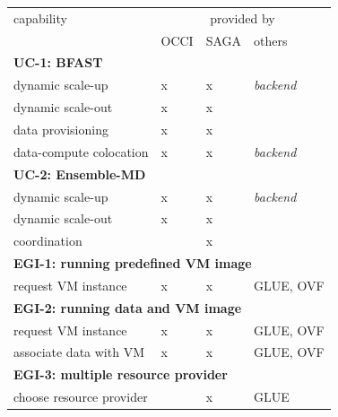 \documentclass[10pt,conference,final,letterpaper,twoside,twocolumn,]{IEEEtran}
\newcommand{\I}[1]{\textit{#1}}
\newcommand{\B}[1]{\textbf{#1}}
\begin{document}
 \begin{table}[thb]
  \centering
  \footnotesize
  \begin{tabular}{|p{37mm}|p{10mm}|p{10mm}|p{15mm}|}
   \hline
   capability                      & \multicolumn{3}{|c|}{provided by}\\
                                   & OCCI                  & SAGA                  & others     \\\hline
   \multicolumn{4}{|l|}{\B{UC-1: BFAST}}                                                        \\
   dynamic scale-up                & x                     & x                     & \I{backend}\\
   dynamic scale-out               & x                     & x                     &            \\
   data provisioning               & x                     & x                     &            \\
   data-compute colocation         & x                     & x                     & \I{backend}\\\hline
   \multicolumn{4}{|l|}{\B{UC-2: Ensemble-MD}}                                                  \\
   dynamic scale-up                & x                     & x                     & \I{backend}\\
   dynamic scale-out               & x                     & x                     &            \\
   coordination                    &                       & x                     &            \\\hline
   \multicolumn{4}{|l|}{\B{EGI-1: running predefined VM image}}                                 \\
   request VM instance             & x                     & x                     & GLUE, OVF  \\\hline
   \multicolumn{4}{|l|}{\B{EGI-2: running data and VM image}}                                   \\
   request VM instance             & x                     & x                     & GLUE, OVF  \\
   associate data with VM          & x                     & x                     & GLUE, OVF  \\\hline
   \multicolumn{4}{|l|}{\B{EGI-3: multiple resource provider}}                                  \\
   choose resource provider        &                       & x                     & GLUE       \\

\end{tabular}
\end{table}
\end{document}
